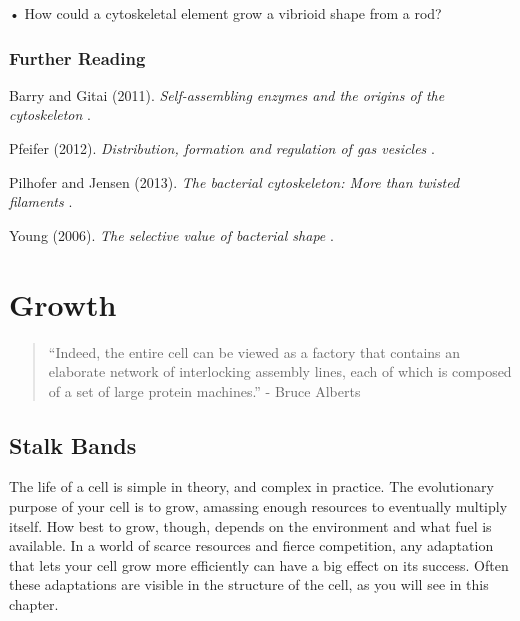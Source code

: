 \documentclass[]{tufte-book}
\begin{document}
• How could a cytoskeletal element grow a vibrioid shape from a rod?

\hypertarget{further-reading-2}{%
\subsection*{Further Reading}\label{further-reading-2}}

Barry and Gitai (2011). \emph{Self-assembling enzymes and the origins of the cytoskeleton} \citep{barry2011}.

Pfeifer (2012). \emph{Distribution, formation and regulation of gas vesicles} \citep{pfeifer2012}.

Pilhofer and Jensen (2013). \emph{The bacterial cytoskeleton: More than twisted filaments} \citep{pilhofer2013}.

Young (2006). \emph{The selective value of bacterial shape} \citep{young2006}.

\hypertarget{growth}{%
\chapter{Growth}\label{growth}}

\begin{quote}
``Indeed, the entire cell can be viewed as a factory that contains an elaborate network of interlocking assembly lines, each of which is composed of a set of large protein machines.''
- Bruce Alberts \citep{alberts1998}
\end{quote}

\hypertarget{stalk-bands}{%
\section{Stalk Bands}\label{stalk-bands}}

The life of a cell is simple in theory, and complex in practice. The evolutionary purpose of your cell is to grow, amassing enough resources to eventually multiply itself. How best to grow, though, depends on the environment and what fuel is available. In a world of scarce resources and fierce competition, any adaptation that lets your cell grow more efficiently can have a big effect on its success. Often these adaptations are visible in the structure of the cell, as you will see in this chapter.
\end{document}
